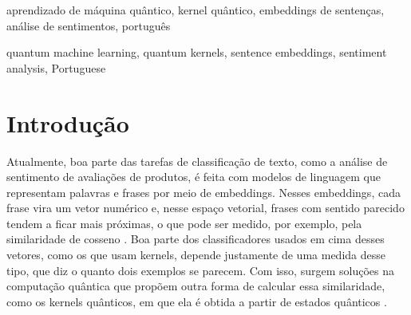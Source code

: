 \documentclass[conference]{IEEEtran}
\begin{document}
\begin{IEEEkeywords}
aprendizado de máquina quântico, kernel quântico, embeddings de sentenças, análise de sentimentos, português
\end{IEEEkeywords}

\renewcommand{\abstractname}{Abstract}
\renewcommand{\IEEEkeywordsname}{Keywords}
\begin{abstract}
Kernel-based classifiers depend on a measure of how similar two examples are, and quantum kernels appear as a different way to compute this similarity, including for sentence embeddings, which need to be compressed to fit into a few qubits. In studies that test this kind of classifier, however, the comparison with classical models is often made under different conditions, which makes it difficult to understand where the difference between them comes from. This work compares a QSVM with a fidelity quantum kernel to classical classifiers that receive exactly the same compressed features, with nested hyperparameter search for all models, using the Yelp dataset, in English, and RePro, in Portuguese. In the exact-state scenario, the QSVM with a tuned bandwidth reached macro-F1 values between 0.91 and 0.95, at the same level as the classical models, and no statistically significant difference from them was detected in any of the 12 configurations. With a fixed bandwidth, the QSVM stayed close to 0.50 on the test set and, with 8 and 12 qubits, memorized the training set, and the circuit without entanglement performed similarly to the entangled one. The results show no detected advantage for the quantum kernel in this comparison and indicate that its performance depends mainly on tuning the bandwidth.
\end{abstract}

\begin{IEEEkeywords}
quantum machine learning, quantum kernels, sentence embeddings, sentiment analysis, Portuguese
\end{IEEEkeywords}

\section{Introdução}

Atualmente, boa parte das tarefas de classificação de texto, como a análise de sentimento de avaliações de produtos, é feita com modelos de linguagem que representam palavras e frases por meio de embeddings. Nesses embeddings, cada frase vira um vetor numérico e, nesse espaço vetorial, frases com sentido parecido tendem a ficar mais próximas, o que pode ser medido, por exemplo, pela similaridade de cosseno \cite{reimers2019}. Boa parte dos classificadores usados em cima desses vetores, como os que usam kernels, depende justamente de uma medida desse tipo, que diz o quanto dois exemplos se parecem. Com isso, surgem soluções na computação quântica que propõem outra forma de calcular essa similaridade, como os kernels quânticos, em que ela é obtida a partir de estados quânticos \cite{havlicek2019}.
\end{document}
